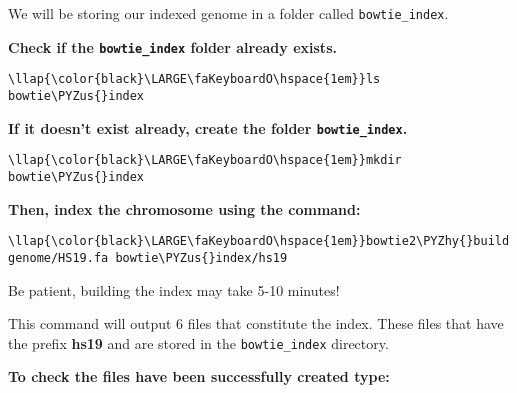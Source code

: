 \documentclass[11pt]{article}
\def\PYZus{\char`\_}
\def\PYZhy{\char`\-}
\begin{document}
    We will be storing our indexed genome in a folder called
\texttt{bowtie\_index}.

\textbf{Check if the \texttt{bowtie\_index} folder already exists.}





\begin{terminalinput}
\begin{Verbatim}[commandchars=\\\{\}]
\llap{\color{black}\LARGE\faKeyboardO\hspace{1em}}ls bowtie\PYZus{}index
\end{Verbatim}
\end{terminalinput}



    \textbf{If it doesn't exist already, create the folder
\texttt{bowtie\_index}.}





\begin{terminalinput}
\begin{Verbatim}[commandchars=\\\{\}]
\llap{\color{black}\LARGE\faKeyboardO\hspace{1em}}mkdir bowtie\PYZus{}index
\end{Verbatim}
\end{terminalinput}



    \textbf{Then, index the chromosome using the command:}





\begin{terminalinput}
\begin{Verbatim}[commandchars=\\\{\}]
\llap{\color{black}\LARGE\faKeyboardO\hspace{1em}}bowtie2\PYZhy{}build genome/HS19.fa bowtie\PYZus{}index/hs19
\end{Verbatim}
\end{terminalinput}



    Be patient, building the index may take 5-10 minutes!

This command will output 6 files that constitute the index. These files
that have the prefix \textbf{hs19} and are stored in the
\texttt{bowtie\_index} directory.

\textbf{To check the files have been successfully created type:}
\end{document}
